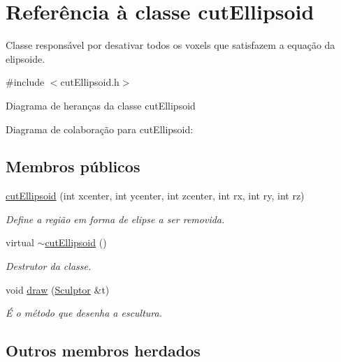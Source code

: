 \hypertarget{classcut_ellipsoid}{}\section{Referência à classe cut\+Ellipsoid}
\label{classcut_ellipsoid}


Classe responsável por desativar todos os voxels que satisfazem a equação da elipsoide.  




{\ttfamily \#include $<$cut\+Ellipsoid.\+h$>$}



Diagrama de heranças da classe cut\+Ellipsoid


Diagrama de colaboração para cut\+Ellipsoid\+:
\subsection*{Membros públicos}
\begin{DoxyCompactItemize}
\item 
\hyperlink{classcut_ellipsoid_ace852f06b6395ceaa5c0382e37e44c8d}{cut\+Ellipsoid} (int xcenter, int ycenter, int zcenter, int rx, int ry, int rz)
\begin{DoxyCompactList}\small\item\em Define a região em forma de elipse a ser removida. \end{DoxyCompactList}\item 
\mbox{\label{classcut_ellipsoid_a918357303816be0d876a9ccf70915893}} 
virtual \hyperlink{classcut_ellipsoid_a918357303816be0d876a9ccf70915893}{$\sim$cut\+Ellipsoid} ()
\begin{DoxyCompactList}\small\item\em Destrutor da classe. \end{DoxyCompactList}\item 
void \hyperlink{classcut_ellipsoid_aa93a018312690a4f61fc13134f84bebc}{draw} (\hyperlink{class_sculptor}{Sculptor} \&t)
\begin{DoxyCompactList}\small\item\em É o método que desenha a escultura. \end{DoxyCompactList}\end{DoxyCompactItemize}
\subsection*{Outros membros herdados}


